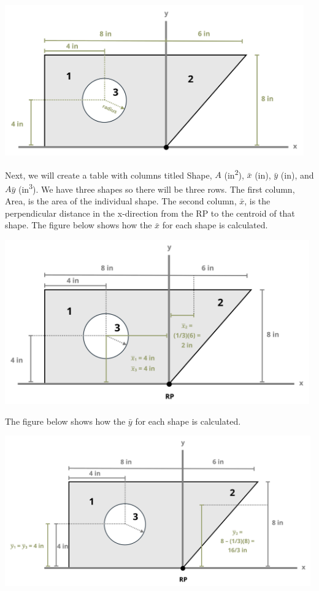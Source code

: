 \documentclass[
  letterpaper,
  DIV=11,
  numbers=noendperiod]{scrreprt}
\theoremstyle{definition}
\theoremstyle{remark}
\begin{document}
\begin{tcolorbox}
\begin{tcolorbox}
\begin{center}
\includegraphics[width=5.07292in,height=\textheight]{images/CH 8 PNGs/example 8.3 part 2.png}
\end{center}

Next, we will create a table with columns titled Shape, \(A\)
(in\textsuperscript{2}), \(\bar{x}\) (in), \(\bar{y}\) (in), and
\(A\bar{y}\) (in\textsuperscript{3}). We have three shapes so there will
be three rows. The first column, Area, is the area of the individual
shape. The second column, \(\bar{x}\), is the perpendicular distance in
the x-direction from the RP to the centroid of that shape. The figure
below shows how the \(\bar{x}\) for each shape is calculated.

\begin{center}
\includegraphics[width=5.16667in,height=\textheight]{images/CH 8 PNGs/example 8.3 part 3.png}
\end{center}

The figure below shows how the \(\bar{y}\) for each shape is calculated.

\begin{center}
\includegraphics[width=5.1875in,height=\textheight]{images/CH 8 PNGs/example 8.3 part 4.png}
\end{center}


\end{tcolorbox}
\end{tcolorbox}
\end{document}
